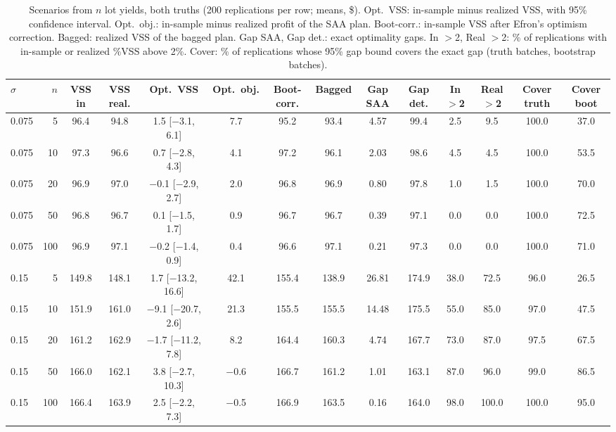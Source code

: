 \begin{table}[t]
\centering
\caption{Scenarios from $n$ lot yields, both truths (200 replications per row; means, \$). Opt.\ VSS: in-sample minus realized VSS, with 95\% confidence interval. Opt.\ obj.: in-sample minus realized profit of the SAA plan. Boot-corr.: in-sample VSS after Efron's optimism correction. Bagged: realized VSS of the bagged plan. Gap SAA, Gap det.: exact optimality gaps. In $>$2, Real $>$2: \% of replications with in-sample or realized \%VSS above 2\%. Cover: \% of replications whose 95\% gap bound covers the exact gap (truth batches, bootstrap batches).}
\label{tab:S-extA-data}
\footnotesize
\setlength{\tabcolsep}{3pt}
\begin{tabular}{@{}lr cc c c cc cc cc cc@{}}
\toprule
$\sigma$ & $n$ & \textbf{VSS in} & \textbf{VSS real.} & \textbf{Opt.\ VSS} & \textbf{Opt.\ obj.} & \textbf{Boot-corr.} & \textbf{Bagged} & \textbf{Gap SAA} & \textbf{Gap det.} & \textbf{In $>$2} & \textbf{Real $>$2} & \textbf{Cover truth} & \textbf{Cover boot} \\
\midrule
0.075 & 5 & 96.4 & 94.8 & 1.5 [$-$3.1, 6.1] & 7.7 & 95.2 & 93.4 & 4.57 & 99.4 & 2.5 & 9.5 & 100.0 & 37.0 \\
0.075 & 10 & 97.3 & 96.6 & 0.7 [$-$2.8, 4.3] & 4.1 & 97.2 & 96.1 & 2.03 & 98.6 & 4.5 & 4.5 & 100.0 & 53.5 \\
0.075 & 20 & 96.9 & 97.0 & $-$0.1 [$-$2.9, 2.7] & 2.0 & 96.8 & 96.9 & 0.80 & 97.8 & 1.0 & 1.5 & 100.0 & 70.0 \\
0.075 & 50 & 96.8 & 96.7 & 0.1 [$-$1.5, 1.7] & 0.9 & 96.7 & 96.7 & 0.39 & 97.1 & 0.0 & 0.0 & 100.0 & 72.5 \\
0.075 & 100 & 96.9 & 97.1 & $-$0.2 [$-$1.4, 0.9] & 0.4 & 96.6 & 97.1 & 0.21 & 97.3 & 0.0 & 0.0 & 100.0 & 71.0 \\
\midrule
0.15 & 5 & 149.8 & 148.1 & 1.7 [$-$13.2, 16.6] & 42.1 & 155.4 & 138.9 & 26.81 & 174.9 & 38.0 & 72.5 & 96.0 & 26.5 \\
0.15 & 10 & 151.9 & 161.0 & $-$9.1 [$-$20.7, 2.6] & 21.3 & 155.5 & 155.5 & 14.48 & 175.5 & 55.0 & 85.0 & 97.0 & 47.5 \\
0.15 & 20 & 161.2 & 162.9 & $-$1.7 [$-$11.2, 7.8] & 8.2 & 164.4 & 160.3 & 4.74 & 167.7 & 73.0 & 87.0 & 97.5 & 67.5 \\
0.15 & 50 & 166.0 & 162.1 & 3.8 [$-$2.7, 10.3] & $-$0.6 & 166.7 & 161.2 & 1.01 & 163.1 & 87.0 & 96.0 & 99.0 & 86.5 \\
0.15 & 100 & 166.4 & 163.9 & 2.5 [$-$2.2, 7.3] & $-$0.5 & 166.9 & 163.5 & 0.16 & 164.0 & 98.0 & 100.0 & 100.0 & 95.0 \\
\bottomrule
\end{tabular}
\end{table}

